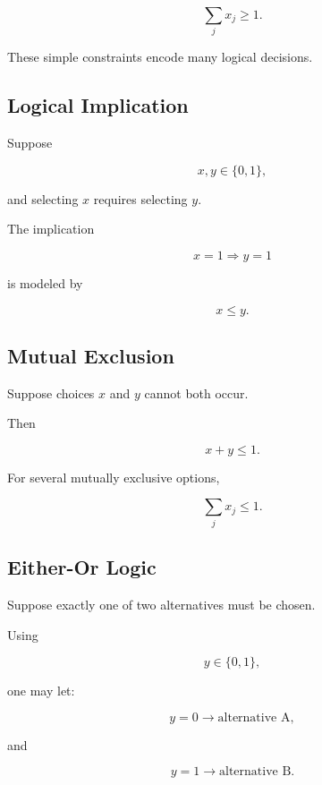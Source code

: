 \[
\boxed{
\sum_jx_j\geq1.
}
\]

These simple constraints encode many logical decisions.

\subsection{Logical Implication}
\label{subsec:binary-logical-implication}

Suppose

\[
x,y\in\{0,1\},
\]

and selecting \(x\) requires selecting \(y\).

The implication

\[
\boxed{
x=1
\Rightarrow
y=1
}
\]

is modeled by

\[
\boxed{
x\leq y.
}
\]

\subsection{Mutual Exclusion}
\label{subsec:binary-mutual-exclusion}

Suppose choices \(x\) and \(y\) cannot both occur.

Then

\[
\boxed{
x+y\leq1.
}
\]

For several mutually exclusive options,

\[
\boxed{
\sum_jx_j\leq1.
}
\]

\subsection{Either-Or Logic}
\label{subsec:either-or-logic}

Suppose exactly one of two alternatives must be chosen.

Using

\[
y\in\{0,1\},
\]

one may let:

\[
\boxed{
y=0
\rightarrow
\text{alternative A},
}
\]

and

\[
\boxed{
y=1
\rightarrow
\text{alternative B}.
}
\]

